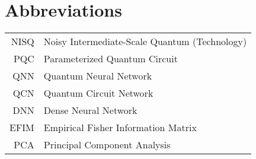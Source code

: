 \chapter*{Abbreviations}
\thispagestyle{plain}



\begin{longtable}{rl}
    NISQ & Noisy Intermediate-Scale Quantum (Technology)  \\
    PQC & Parameterized Quantum Circuit \\
    QNN & Quantum Neural Network\\
    QCN & Quantum Circuit Network\\
    DNN & Dense Neural Network\\
    EFIM & Empirical Fisher Information Matrix\\
    PCA & Principal Component Analysis\\
\end{longtable}